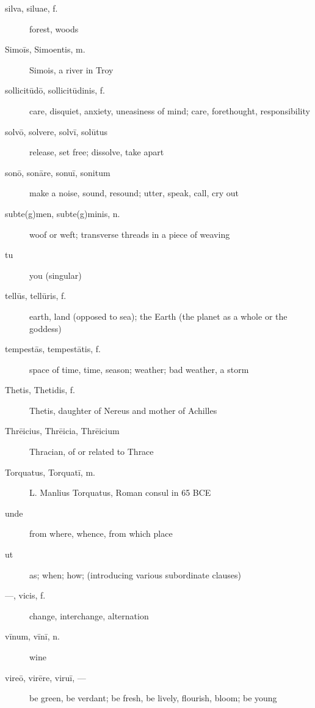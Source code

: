 \begin{description}
    \item[silva, siluae, f.] forest, woods
    \item[Simoīs, Simoentis, m.] Simois, a river in Troy
    \item[sollicitūdō, sollicitūdinis, f.] care, disquiet, anxiety, uneasiness
        of mind; care, forethought, responsibility
    \item[solvō, solvere, solvī, solūtus] release, set free; dissolve, take
        apart
    \item[sonō, sonāre, sonuī, sonitum] make a noise, sound, resound; utter,
        speak, call, cry out
    \item[subte(g)men, subte(g)minis, n.] woof or weft; transverse threads in
        a piece of weaving
    \item[tu] you (singular)
    \item[tellūs, tellūris, f.] earth, land (opposed to sea); the Earth (the
        planet as a whole or the goddess)
    \item[tempestās, tempestātis, f.] space of time, time, season; weather; bad
        weather, a storm
    \item[Thetis, Thetidis, f.] Thetis, daughter of Nereus and mother of
        Achilles
    \item[Thrēicius, Thrēicia, Thrēicium] Thracian, of or related to Thrace
    \item[Torquatus, Torquatī, m.] L. Manlius Torquatus, Roman consul in 65 BCE
    \item[unde] from where, whence, from which place
    \item[ut] as; when; how; (introducing various subordinate clauses)
    \item[---, vicis, f.] change, interchange, alternation
    \item[vīnum, vīnī, n.] wine
    \item[vireō, virēre, viruī, ---] be green, be verdant; be fresh, be lively,
        flourish, bloom; be young
\end{description}
